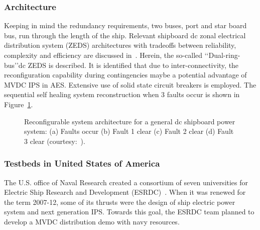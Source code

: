 \documentclass[10pt]{IETBook}
\begin{document}
\subsubsection{Architecture}
Keeping in mind the redundancy requirements, two buses, port and star board bus, run through the length of the ship. Relevant shipboard dc zonal electrical distribution system (ZEDS) architectures with tradeoffs between reliability, complexity and efficiency are discussed in~\cite{alb}. Herein, the so-called \lq \lq Dual-ring-bus\rq \rq dc ZEDS is described. It is identified that due to inter-connectivity, the reconfiguration capability during contingencies maybe a potential advantage of MVDC IPS in AES. Extensive use of solid state circuit breakers is employed. The sequential self healing system reconstruction when 3 faults occur is shown in Figure~\ref{figalb}.
\begin{figure}[!h]
\centerline{}
\caption{Reconfigurable system architecture for a general dc shipboard power system: (a) Faults occur (b) Fault 1 clear (c) Fault 2 clear (d) Fault 3 clear (courtesy:~\cite{alb}).}
\label{figalb}
\end{figure}
\subsubsection{Testbeds in United States of America}
The U.S. office of Naval Research created a consortium of seven universities for Electric Ship Research and Development (ESRDC)~\cite{usuninavy}. When it was renewed for the term 2007-12, some of its thrusts were the design of ship electric power system and next generation IPS. Towards this goal, the ESRDC team planned to develop a MVDC distribution demo with navy resources.
\end{document}
